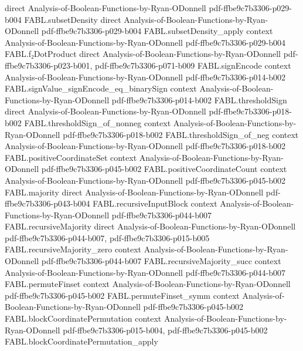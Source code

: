 \begin{theorem}
  {direct}
  {Analysis-of-Boolean-Functions-by-Ryan-ODonnell}
  {pdf-ffbe9c7b3306-p029-b004}
\proofstep
  {FABL.subsetDensity}
  {direct}
  {Analysis-of-Boolean-Functions-by-Ryan-ODonnell}
  {pdf-ffbe9c7b3306-p029-b004}
\proofstep
  {FABL.subsetDensity_apply}
  {context}
  {Analysis-of-Boolean-Functions-by-Ryan-ODonnell}
  {pdf-ffbe9c7b3306-p029-b004}
\proofstep
  {FABL.f₂DotProduct}
  {direct}
  {Analysis-of-Boolean-Functions-by-Ryan-ODonnell}
  {pdf-ffbe9c7b3306-p023-b001,
    pdf-ffbe9c7b3306-p071-b009}
\proofstep
  {FABL.signEncode}
  {context}
  {Analysis-of-Boolean-Functions-by-Ryan-ODonnell}
  {pdf-ffbe9c7b3306-p014-b002}
\proofstep
  {FABL.signValue_signEncode_eq_binarySign}
  {context}
  {Analysis-of-Boolean-Functions-by-Ryan-ODonnell}
  {pdf-ffbe9c7b3306-p014-b002}
\proofstep
  {FABL.thresholdSign}
  {direct}
  {Analysis-of-Boolean-Functions-by-Ryan-ODonnell}
  {pdf-ffbe9c7b3306-p018-b002}
\proofstep
  {FABL.thresholdSign_of_nonneg}
  {context}
  {Analysis-of-Boolean-Functions-by-Ryan-ODonnell}
  {pdf-ffbe9c7b3306-p018-b002}
\proofstep
  {FABL.thresholdSign_of_neg}
  {context}
  {Analysis-of-Boolean-Functions-by-Ryan-ODonnell}
  {pdf-ffbe9c7b3306-p018-b002}
\proofstep
  {FABL.positiveCoordinateSet}
  {context}
  {Analysis-of-Boolean-Functions-by-Ryan-ODonnell}
  {pdf-ffbe9c7b3306-p045-b002}
\proofstep
  {FABL.positiveCoordinateCount}
  {context}
  {Analysis-of-Boolean-Functions-by-Ryan-ODonnell}
  {pdf-ffbe9c7b3306-p045-b002}
\proofstep
  {FABL.majority}
  {direct}
  {Analysis-of-Boolean-Functions-by-Ryan-ODonnell}
  {pdf-ffbe9c7b3306-p043-b004}
\proofstep
  {FABL.recursiveInputBlock}
  {context}
  {Analysis-of-Boolean-Functions-by-Ryan-ODonnell}
  {pdf-ffbe9c7b3306-p044-b007}
\proofstep
  {FABL.recursiveMajority}
  {direct}
  {Analysis-of-Boolean-Functions-by-Ryan-ODonnell}
  {pdf-ffbe9c7b3306-p044-b007,
    pdf-ffbe9c7b3306-p015-b005}
\proofstep
  {FABL.recursiveMajority_zero}
  {context}
  {Analysis-of-Boolean-Functions-by-Ryan-ODonnell}
  {pdf-ffbe9c7b3306-p044-b007}
\proofstep
  {FABL.recursiveMajority_succ}
  {context}
  {Analysis-of-Boolean-Functions-by-Ryan-ODonnell}
  {pdf-ffbe9c7b3306-p044-b007}
\proofstep
  {FABL.permuteFinset}
  {context}
  {Analysis-of-Boolean-Functions-by-Ryan-ODonnell}
  {pdf-ffbe9c7b3306-p045-b002}
\proofstep
  {FABL.permuteFinset_symm}
  {context}
  {Analysis-of-Boolean-Functions-by-Ryan-ODonnell}
  {pdf-ffbe9c7b3306-p045-b002}
\proofstep
  {FABL.blockCoordinatePermutation}
  {context}
  {Analysis-of-Boolean-Functions-by-Ryan-ODonnell}
  {pdf-ffbe9c7b3306-p015-b004,
    pdf-ffbe9c7b3306-p045-b002}
\proofstep
  {FABL.blockCoordinatePermutation_apply}

\end{theorem}
